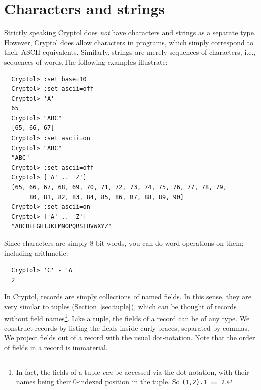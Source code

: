 \section{Characters and strings}
\label{sec:charstring}

Strictly speaking Cryptol does {\em not} have characters and strings
as a separate type. However, Cryptol does allow characters in
programs, which simply correspond to their ASCII
equivalents. Similarly, strings are merely sequences of characters,
i.e., sequences of words.\indTheStringType\indTheCharType The
following examples illustrate:
\begin{Verbatim}
  Cryptol> :set base=10
  Cryptol> :set ascii=off
  Cryptol> 'A'
  65
  Cryptol> "ABC"
  [65, 66, 67]
  Cryptol> :set ascii=on
  Cryptol> "ABC"
  "ABC"
  Cryptol> :set ascii=off
  Cryptol> ['A' .. 'Z']
  [65, 66, 67, 68, 69, 70, 71, 72, 73, 74, 75, 76, 77, 78, 79, 
       80, 81, 82, 83, 84, 85, 86, 87, 88, 89, 90]
  Cryptol> :set ascii=on
  Cryptol> ['A' .. 'Z']
  "ABCDEFGHIJKLMNOPQRSTUVWXYZ"
\end{Verbatim}

\noindent Since characters are simply 8-bit words, you can do word
operations on them; including arithmetic:
\begin{Verbatim}
  Cryptol> 'C' - 'A'
  2
\end{Verbatim}


In Cryptol, records are simply collections of named fields. In this
sense, they are very similar to tuples (Section~\ref{sec:tuple}),
which can be thought of records without field names\footnote{In fact,
  the fields of a tuple {\it can} be accessed via the dot-notation,
  with their names being their 0-indexed position in the tuple. So
  {\tt (1,2).1 == 2}.}. Like a tuple, the fields of a record can be of
any type.  We construct records by listing the fields inside
curly-braces, separated by commas.  We project fields out of a record
with the usual dot-notation.  Note that the order of fields in a
record is immaterial.\indTheRecordType\indTheTupleType

